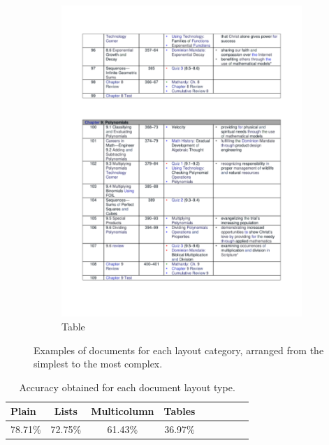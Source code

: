 \begin{figure}[!htbp]
\begin{subfigure}[b]{0.24\textwidth}
        \includegraphics[width=\textwidth]{images/chapter4/tables.pdf}
        \caption{Table}
      \end{subfigure}
    \caption{Examples of documents for each layout category, arranged from the simplest to the most complex.}
    \label{fig:layout-examples}
\end{figure}

\begin{table}[!htbp]
  \centering
  \small
  \begin{adjustbox}{max width=\textwidth}
  \begin{threeparttable}
  \begin{tabular}{lcccccccc}
      \toprule
          \textbf{Plain} & \textbf{Lists} & \textbf{Multicolumn} & \textbf{Tables}\\
      \midrule
      78.71\% & 72.75\% & 61.43\% & 36.97\%\\
  \bottomrule
  \end{tabular}
  \end{threeparttable}
  \end{adjustbox}
  \caption{Accuracy obtained for each document layout type.}
  \label{table:ocr-preliminary-experiments}
  \end{table}

